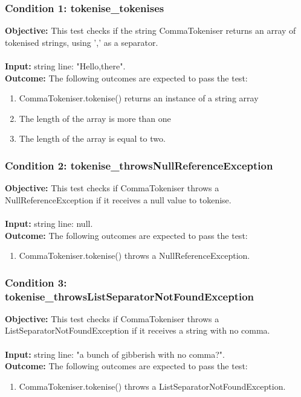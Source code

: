 \documentclass[a4paper,12pt]{article}
\begin{document}
		\subsubsection{Condition 1: tokenise\_tokenises}
			\textbf{Objective:} This test checks if the string CommaTokeniser returns an array of tokenised strings, using ',' as a separator.\\\\
			\textbf{Input:} string line: "Hello,there".\\
			\textbf{Outcome:} The following outcomes are expected to pass the test:
				\begin{enumerate}
					\item CommaTokeniser.tokenise() returns an instance of a string array
					\item The length of the array is more than one
					\item The length of the array is equal to two.
				\end{enumerate}
		\subsubsection{Condition 2: tokenise\_throwsNullReferenceException}
			\textbf{Objective:} This test checks if CommaTokeniser throws a NullReferenceException if it receives a null value to tokenise.\\\\
			\textbf{Input:} string line: null.\\
			\textbf{Outcome:} The following outcomes are expected to pass the test:
				\begin{enumerate}
					\item CommaTokeniser.tokenise() throws a NullReferenceException.
				\end{enumerate}
		\subsubsection{Condition 3: tokenise\_throwsListSeparatorNotFoundException}
			\textbf{Objective:} This test checks if CommaTokeniser throws a ListSeparatorNotFoundException if it receives a string with no comma.\\\\
			\textbf{Input:} string line: "a bunch of gibberish with no comma?".\\
			\textbf{Outcome:} The following outcomes are expected to pass the test:
				\begin{enumerate}
					\item CommaTokeniser.tokenise() throws a ListSeparatorNotFoundException.
				\end{enumerate}
\end{document}
